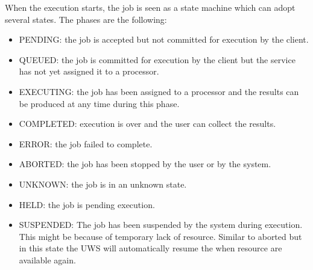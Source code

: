 When the execution starts, the job is seen as a state machine which can adopt several states. The phases are the following:

\begin{itemize}

\item 
    PENDING: the job is accepted but not committed for execution by the client.
\item
    QUEUED: the job is committed for execution by the client but the service has not yet assigned it to a processor.
\item
    EXECUTING: the job has been assigned to a processor and the results can be produced at any time during this phase.
\item
    COMPLETED: execution is over and the user can collect the results.
\item
    ERROR: the job failed to complete.
\item
    ABORTED: the job has been stopped by the user or by the system.
\item
    UNKNOWN: the job is in an unknown state.
\item
    HELD: the job is pending execution.
\item
    SUSPENDED: The job has been suspended by the system during execution. This might be because of temporary lack of resource. Similar to aborted but in this state the UWS will automatically resume the when resource are available again.

\end{itemize}

% 
% 
% 
% 
% 


